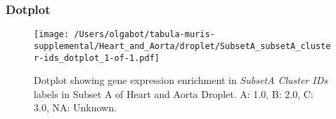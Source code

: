 \clearpage

\subsubsection{Dotplot}
\begin{figure}[h]
\centering
\texttt{[image: /Users/olgabot/tabula-muris-supplemental/Heart\_and\_Aorta/droplet/SubsetA\_subsetA\_cluster-ids\_dotplot\_1-of-1.pdf]}

\caption{ Dotplot  showing gene expression enrichment in \emph{SubsetA Cluster IDs} labels in Subset A of Heart and Aorta Droplet. A: 1.0, B: 2.0, C: 3.0, NA: Unknown.}
\end{figure}

